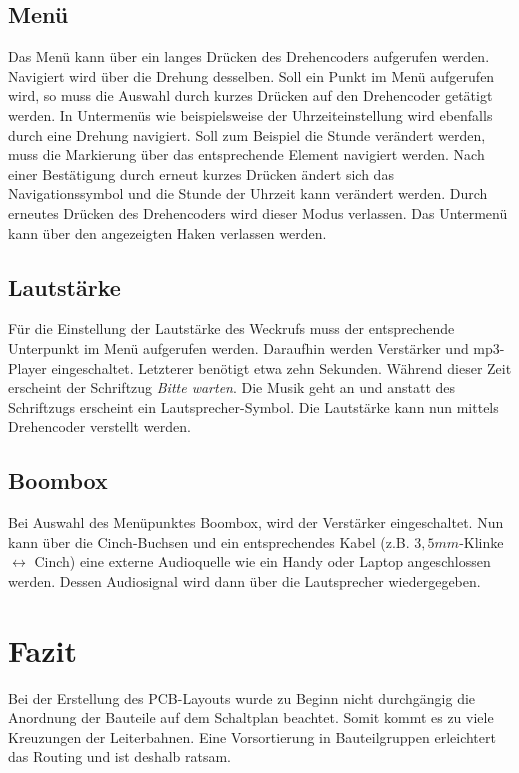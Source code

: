 \documentclass[journal, a4paper]{IEEEtran}
\begin{document}
\subsection{Menü}
Das Menü kann über ein langes Drücken des Drehencoders aufgerufen werden. Navigiert wird über die Drehung desselben. Soll ein Punkt im Menü aufgerufen wird, so muss die Auswahl durch kurzes Drücken auf den Drehencoder getätigt werden. In Untermenüs wie beispielsweise der Uhrzeiteinstellung wird ebenfalls durch eine Drehung navigiert. Soll zum Beispiel die Stunde verändert werden, muss die Markierung über das entsprechende Element navigiert werden. Nach einer Bestätigung durch erneut kurzes Drücken ändert sich das Navigationssymbol und die Stunde der Uhrzeit kann verändert werden. Durch erneutes Drücken des Drehencoders wird dieser Modus verlassen. Das Untermenü kann über den angezeigten Haken verlassen werden.
\subsection{Lautstärke}
Für die Einstellung der Lautstärke des Weckrufs muss der entsprechende Unterpunkt im Menü aufgerufen werden. Daraufhin werden Verstärker und mp3-Player eingeschaltet. Letzterer benötigt etwa zehn Sekunden. Während dieser Zeit erscheint der Schriftzug \emph{\glqq Bitte warten\grqq}. Die Musik geht an und anstatt des Schriftzugs erscheint ein Lautsprecher-Symbol. Die Lautstärke kann nun mittels Drehencoder verstellt werden.
\subsection{Boombox}
Bei Auswahl des Menüpunktes Boombox, wird der Verstärker eingeschaltet. Nun kann über die Cinch-Buchsen und ein entsprechendes Kabel (z.B. $3,5mm$-Klinke $\leftrightarrow$ Cinch) eine externe Audioquelle wie ein Handy oder Laptop angeschlossen werden. Dessen Audiosignal wird dann über die Lautsprecher wiedergegeben.
	



\section{Fazit}
Bei der Erstellung des PCB-Layouts wurde zu Beginn nicht durchgängig die Anordnung der Bauteile auf dem Schaltplan beachtet. Somit kommt es zu viele Kreuzungen der Leiterbahnen. Eine Vorsortierung in Bauteilgruppen erleichtert das Routing und ist deshalb ratsam.
\end{document}
